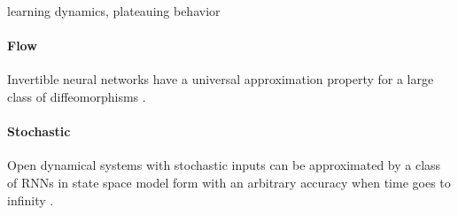 \documentclass{article}
\theoremstyle{definition}
\theoremstyle{remark}
\begin{document}
learning dynamics, plateauing behavior \citep{hanson2020universal}
\citep{hanson2021learning}



\paragraph{Flow}
Invertible neural networks have a universal approximation property for a  large class of diffeomorphisms   \citep{ishikawa2023universal}.


\paragraph{Stochastic}

\citep{hart2021echo}

\citep{gonon2019reservoir}

Open dynamical systems with stochastic inputs can be approximated by a class of RNNs in state space model form with an arbitrary accuracy when time goes to infinity \citep{chen2022universal}.
\end{document}
